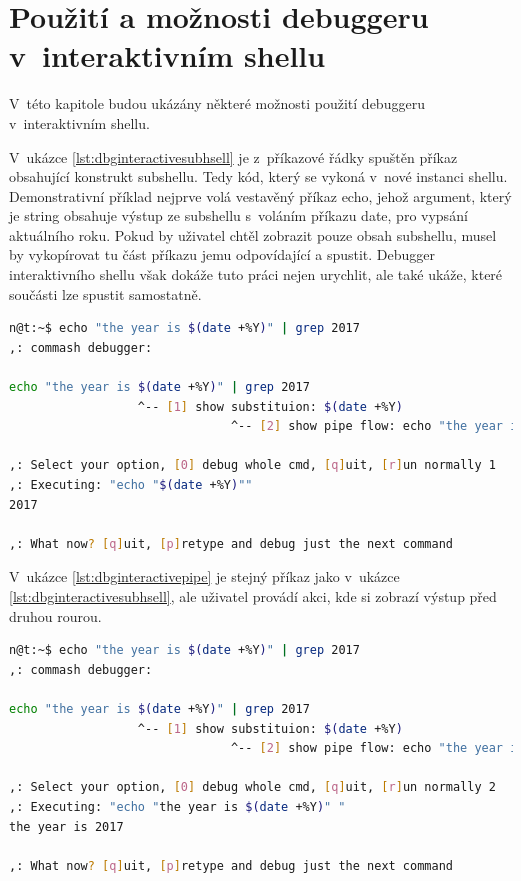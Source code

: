 \documentclass[thesis=M,czech]{FITthesis}[2012/06/26]
\begin{document}
\section{Použití a možnosti debuggeru v~interaktivním shellu}

V~této kapitole budou ukázány některé možnosti použití debuggeru v~interaktivním shellu.

V~ukázce \ref{lst:dbginteractivesubhsell} je z~příkazové řádky spuštěn příkaz obsahující konstrukt subshellu. Tedy kód, který se vykoná v~nové instanci shellu. Demonstrativní příklad nejprve volá vestavěný příkaz echo, jehož argument, který je string obsahuje výstup ze subshellu s~voláním příkazu date, pro vypsání aktuálního roku. Pokud by uživatel chtěl zobrazit pouze obsah subshellu, musel by vykopírovat tu část příkazu jemu odpovídající a spustit. Debugger interaktivního shellu však dokáže tuto práci nejen urychlit, ale také ukáže, které součásti lze spustit samostatně.

\begin{minipage}{\linewidth}
\begin{lstlisting}[language=bash, caption={Debugger interaktivního shellu - subshell}, label={lst:dbginteractivesubhsell}]
n@t:~$ echo "the year is $(date +%Y)" | grep 2017
,: commash debugger:

echo "the year is $(date +%Y)" | grep 2017
                  ^-- [1] show substituion: $(date +%Y)
                               ^-- [2] show pipe flow: echo "the year is $(date +%Y)"

,: Select your option, [0] debug whole cmd, [q]uit, [r]un normally 1
,: Executing: "echo "$(date +%Y)""
2017

,: What now? [q]uit, [p]retype and debug just the next command
\end{lstlisting}
\end{minipage}

V~ukázce \ref{lst:dbginteractivepipe} je stejný příkaz jako v~ukázce \ref{lst:dbginteractivesubhsell}, ale uživatel provádí akci, kde si zobrazí výstup před druhou rourou.

\begin{minipage}{\linewidth}
\begin{lstlisting}[language=bash, caption={Debugger interaktivního shellu - subshell}, label={lst:dbginteractivepipe}]
n@t:~$ echo "the year is $(date +%Y)" | grep 2017
,: commash debugger:

echo "the year is $(date +%Y)" | grep 2017
                  ^-- [1] show substituion: $(date +%Y)
                               ^-- [2] show pipe flow: echo "the year is $(date +%Y)"

,: Select your option, [0] debug whole cmd, [q]uit, [r]un normally 2
,: Executing: "echo "the year is $(date +%Y)" "
the year is 2017

,: What now? [q]uit, [p]retype and debug just the next command
\end{lstlisting}
\end{minipage}
\end{document}
